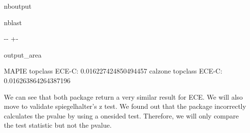 \documentclass[letterpaper,10pt,english]{sphinxmanual}
\begin{document}
\begin{sphinxuseclass}{nboutput}
\begin{sphinxuseclass}{nblast}
{

\kern-\sphinxverbatimsmallskipamount\kern-\baselineskip
\kern+\FrameHeightAdjust\kern-\fboxrule
\vspace{\nbsphinxcodecellspacing}

\begin{sphinxuseclass}{output_area}
\begin{sphinxuseclass}{}


\begin{sphinxVerbatim}[commandchars=\\\{\}]
MAPIE topclass ECE-C: 0.016227424850494457
calzone topclass ECE-C: 0.016263864264387196
\end{sphinxVerbatim}



\end{sphinxuseclass}
\end{sphinxuseclass}
}

\end{sphinxuseclass}
\end{sphinxuseclass}
\sphinxAtStartPar
We can see that both package return a very similar result for ECE. We will also move to validate spiegelhalter’s z test. We found out that the  package incorrectly calculates the p\sphinxhyphen{}value by using a one\sphinxhyphen{}sided test. Therefore, we will only compare the test statistic but not the p\sphinxhyphen{}value.
\end{document}
